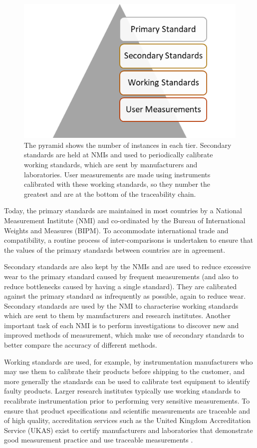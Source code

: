 \documentclass[../thesis.tex]{subfiles}
\begin{document}
\begin{refsection}
\begin{figure}
	\centering
	\includegraphics[]{traceability}
	\caption{The pyramid shows the number of instances in each tier. Secondary standards are held at NMIs and used to periodically calibrate working standards, which are sent by manufacturers and laboratories. User measurements are made using instruments calibrated with these working standards, so they number the greatest and are at the bottom of the traceability chain.}
	\label{ch3_traceability}
\end{figure}

Today, the primary standards are maintained in most countries by a National Measurement Institute (NMI) and co-ordinated by the Bureau of International Weights and Measures (BIPM). To accommodate international trade and compatibility, a routine process of inter-comparisons is undertaken to ensure that the values of the primary standards between countries are in agreement.

Secondary standards are also kept by the NMIs and are used to reduce excessive wear to the primary standard caused by frequent measurements (and also to reduce bottlenecks caused by having a single standard). They are calibrated against the primary standard as infrequently as possible, again to reduce wear. Secondary standards are used by the NMI to characterise working standards which are sent to them by manufacturers and research institutes. Another important task of each NMI is to perform investigations to discover new and improved methods of measurement, which make use of secondary standards to better compare the accuracy of different methods.

Working standards are used, for example, by instrumentation manufacturers who may use them to calibrate their products before shipping to the customer, and more generally the standards can be used to calibrate test equipment to identify faulty products. Larger research institutes typically use working standards to recalibrate instrumentation prior to performing very sensitive measurements. To ensure that product specifications and scientific measurements are traceable and of high quality, accreditation services such as the United Kingdom Accreditation Service (UKAS) exist to certify manufacturers and laboratories that demonstrate good measurement practice and use traceable measurements \cite{UKAS}.


\end{refsection}
\end{document}
